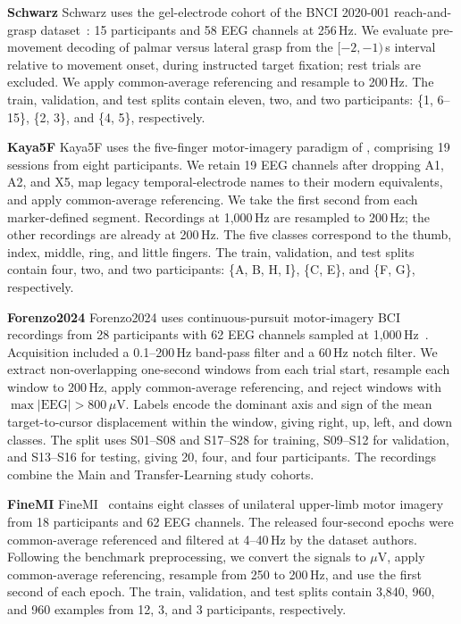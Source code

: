 \noindent\textbf{Schwarz}
Schwarz uses the gel-electrode cohort of the BNCI 2020-001 reach-and-grasp dataset~\citep{schwarz2020analyzing}: 15 participants and 58 EEG channels at 256\,Hz. We evaluate pre-movement decoding of palmar versus lateral grasp from the $[-2,-1)$\,s interval relative to movement onset, during instructed target fixation; rest trials are excluded. We apply common-average referencing and resample to 200\,Hz. The train, validation, and test splits contain eleven, two, and two participants: \{1, 6--15\}, \{2, 3\}, and \{4, 5\}, respectively.

\noindent\textbf{Kaya5F}
Kaya5F uses the five-finger motor-imagery paradigm of \citet{kaya2018large}, comprising 19 sessions from eight participants. We retain 19 EEG channels after dropping A1, A2, and X5, map legacy temporal-electrode names to their modern equivalents, and apply common-average referencing. We take the first second from each marker-defined segment. Recordings at 1,000\,Hz are resampled to 200\,Hz; the other recordings are already at 200\,Hz. The five classes correspond to the thumb, index, middle, ring, and little fingers. The train, validation, and test splits contain four, two, and two participants: \{A, B, H, I\}, \{C, E\}, and \{F, G\}, respectively.

\noindent\textbf{Forenzo2024}
Forenzo2024 uses continuous-pursuit motor-imagery BCI recordings from 28 participants with 62 EEG channels sampled at 1,000\,Hz~\citep{forenzo2024continuous}. Acquisition included a 0.1--200\,Hz band-pass filter and a 60\,Hz notch filter. We extract non-overlapping one-second windows from each trial start, resample each window to 200\,Hz, apply common-average referencing, and reject windows with $\max |\mathrm{EEG}|>800\,\mu$V. Labels encode the dominant axis and sign of the mean target-to-cursor displacement within the window, giving right, up, left, and down classes. The split uses S01--S08 and S17--S28 for training, S09--S12 for validation, and S13--S16 for testing, giving 20, four, and four participants. The recordings combine the Main and Transfer-Learning study cohorts.

\noindent\textbf{FineMI}
FineMI~\citep{yi2025multimodal} contains eight classes of unilateral upper-limb motor imagery from 18 participants and 62 EEG channels. The released four-second epochs were common-average referenced and filtered at 4--40\,Hz by the dataset authors. Following the benchmark preprocessing, we convert the signals to $\mu$V, apply common-average referencing, resample from 250 to 200\,Hz, and use the first second of each epoch. The train, validation, and test splits contain 3,840, 960, and 960 examples from 12, 3, and 3 participants, respectively.

